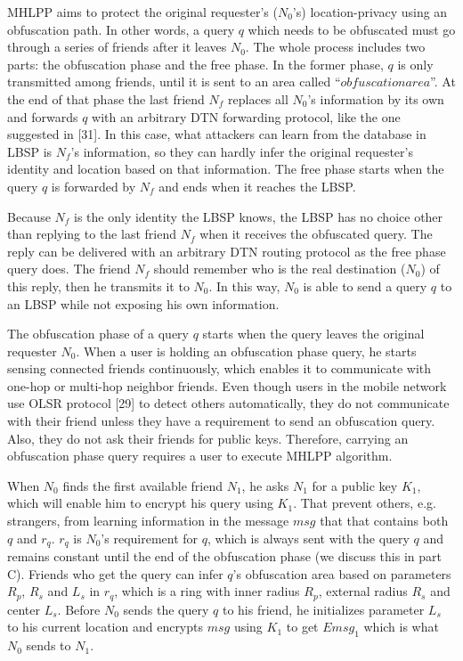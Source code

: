 \noindent MHLPP aims to protect the original requester's ($N_0$'s) location-privacy using an obfuscation path. In other words, a query $q$ which needs to be obfuscated must go through a series of friends after it leaves $N_0$. The whole process includes two parts: the obfuscation phase and the free phase. In the former phase, $q$ is only transmitted among friends, until it is sent to an area called ``$obfuscation area$''. At the end of that phase the last friend $N_f$ replaces all $N_0$'s information by its own and forwards $q$ with an arbitrary DTN forwarding protocol, like the one suggested in [31]. In this case, what attackers can learn from the database in LBSP is $N_f$'s information, so they can hardly infer the original requester's identity and location based on that information. The free phase starts when the query $q$ is forwarded by $N_f$ and ends when it reaches the LBSP. 

Because $N_f$ is the only identity the LBSP knows, the LBSP has no choice other than replying to the last friend $N_f$ when it receives the obfuscated query. The reply can be delivered with an arbitrary DTN routing protocol as the free phase query does. The friend $N_f$ should remember who is the real destination ($N_0$) of this reply, then he transmits it to $N_0$. In this way, $N_0$ is able to send a query $q$ to an LBSP while not exposing his own information.

The obfuscation phase of a query $q$ starts when the query leaves the original requester $N_0$. When a user is holding an obfuscation phase query, he starts sensing connected friends continuously, which enables it to communicate with one-hop or multi-hop neighbor friends. Even though users in the mobile network use OLSR protocol [29] to detect others automatically, they do not communicate with their friend unless they have a requirement to send an obfuscation query. Also, they do not ask their friends for public keys. Therefore, carrying an obfuscation phase query requires a user to execute MHLPP algorithm.

When $N_0$ finds the first available friend $N_1$, he asks $N_1$ for a public key $K_1$, which will enable him to encrypt his query using $K_1$. That prevent others, e.g. strangers, from learning information in the message $msg$ that that contains both $q$ and $r_q$. $r_q$ is $N_0$'s requirement for $q$, which is always sent with the query $q$ and remains constant until the end of the obfuscation phase (we discuss this in part C). Friends who get the query can infer $q$'s obfuscation area based on parameters $R_p$, $R_s$ and $L_s$ in $r_q$, which is a ring with inner radius $R_p$, external radius $R_s$ and center $L_s$. Before $N_0$ sends the query $q$ to his friend, he initializes parameter $L_s$ to his current location and encrypts $msg$ using $K_1$ to get ${Emsg}_1$ which is what $N_0$ sends to ${N}_1$.

